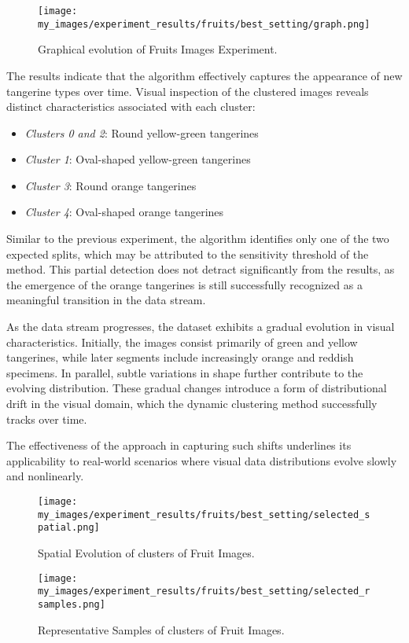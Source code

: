 \begin{figure}[H]
      \centering
      \texttt{[image: my\_images/experiment\_results/fruits/best\_setting/graph.png]}
      \caption{Graphical evolution of Fruits Images Experiment.}
\end{figure}

The results indicate that the algorithm effectively captures the appearance of
new tangerine types over time. Visual inspection of the clustered images
reveals distinct characteristics associated with each cluster:

\begin{itemize}
      \item \emph{Clusters 0 and 2}: Round yellow-green tangerines
      \item \emph{Cluster 1}: Oval-shaped yellow-green tangerines
      \item \emph{Cluster 3}: Round orange tangerines
      \item \emph{Cluster 4}: Oval-shaped orange tangerines
\end{itemize}

Similar to the previous experiment, the algorithm identifies only one of the
two expected splits, which may be attributed to the sensitivity threshold of
the method. This partial detection does not detract significantly from the
results, as the emergence of the orange tangerines is still successfully
recognized as a meaningful transition in the data stream.

As the data stream progresses, the dataset exhibits a gradual evolution in
visual characteristics. Initially, the images consist primarily of green and
yellow tangerines, while later segments include increasingly orange and reddish
specimens. In parallel, subtle variations in shape further contribute to the
evolving distribution. These gradual changes introduce a form of distributional
drift in the visual domain, which the dynamic clustering method successfully
tracks over time.

The effectiveness of the approach in capturing such shifts underlines its
applicability to real-world scenarios where visual data distributions evolve
slowly and nonlinearly.

\begin{figure}[H]
      \centering
      \texttt{[image: my\_images/experiment\_results/fruits/best\_setting/selected\_spatial.png]}
      \caption{Spatial Evolution of clusters of Fruit Images.}
\end{figure}

\begin{figure}[H]
      \centering
      \texttt{[image: my\_images/experiment\_results/fruits/best\_setting/selected\_rsamples.png]}
      \caption{Representative Samples of clusters of Fruit Images.}
\end{figure}